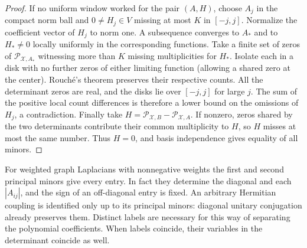 \documentclass[11pt]{article}
\newcommand{\cX}{\mathcal X}
\newcommand{\PP}{\mathcal P}
\begin{document}
\begin{proof}
If no uniform window worked for the pair $(A,H)$, choose $A_j$ in the compact norm ball and $0\ne H_j\in V$ missing at most $K$ in $[-j,j]$. Normalize the coefficient vector of $H_j$ to norm one. A subsequence converges to $A_*$ and to $H_*\ne0$ locally uniformly in the corresponding functions. Take a finite set of zeros of $\PP_{\cX,A_*}$ witnessing more than $K$ missing multiplicities for $H_*$. Isolate each in a disk with no further zeros of either limiting function (allowing a shared zero at the center). Rouch\'e's theorem preserves their respective counts. All the determinant zeros are real, and the disks lie over $[-j,j]$ for large $j$. The sum of the positive local count differences is therefore a lower bound on the omissions of $H_j$, a contradiction. Finally take $H=\PP_{\cX,B}-\PP_{\cX,A}$. If nonzero, zeros shared by the two determinants contribute their common multiplicity to $H$, so $H$ misses at most the same number. Thus $H=0$, and basis independence gives equality of all minors.
\end{proof}

For weighted graph Laplacians with nonnegative weights the first and second principal minors give every entry. In fact they determine the diagonal and each $|A_{ij}|$, and the sign of an off-diagonal entry is fixed. An arbitrary Hermitian coupling is identified only up to its principal minors: diagonal unitary conjugation already preserves them. Distinct labels are necessary for this way of separating the polynomial coefficients. When labels coincide, their variables in the determinant coincide as well.


\end{document}
